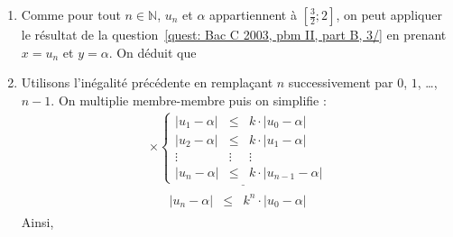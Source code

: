 \begin{description}
\begin{enumerate}
\begin{enumerate}
\begin{itemize}
							\item Comme $h'(x) \leq 0$ alors la fonction $h$ est d\'ecroissante.
								Par cons\'equent 
								$ \frac{3}{2} \leq u_n \leq 2 \Rightarrow h \left( \frac{3}{2} \right) \geq h (u_n) \geq h(2)$,
								c'est-\`a-dire 
								$ \expo{\frac{2}{3}} \geq u_{n+1} \geq \expo{\frac{1}{2}} $.
								De plus, $2 \geq h(2) = \expo{\frac{2}{3}}$ et $h(2) = \expo{\frac{1}{2}} \geq \frac{3}{2}$ ;
								donc 
								\emph{$ \frac{3}{2} \leq u_{n+1} \leq 2$}.
								Ainsi, la propri\'et\'e est vraie \`a l'ordre $n+1$ et ceci ach\`eve notre d\'emonstration.
						\end{itemize}
						On d\'eduit que 
					\item {}
						Comme pour tout $n \in \mathbb{N}$, $u_n$ et $\alpha$ appartiennent \`a $\left[\frac{3}{2} ; 2 \right]$, 
						on peut appliquer le r\'esultat de la question~\ref{quest: Bac C 2003, pbm II, part B, 3/}
						en prenant $x = u_n$ et $y = \alpha$.
						On d\'eduit que 
					\item 
							Utilisons l'in\'egalit\'e pr\'ec\'edente en rempla\c{c}ant $n$ successivement par $0$, $1$, \ldots , $n-1$.
							On multiplie membre-membre puis on simplifie :
							\[
								\begin{matrix}
										\times
									\underline{
										\left\lbrace
											\begin{array}{ccc}
												| u_1 - \alpha |	& \leq 	& k 	\cdot	| u_0 		- \alpha	| 	\\
												| u_2 - \alpha |	& \leq 	& k 	\cdot	| u_1 		- \alpha	| 	\\
														\vdots			& \vdots	&		\vdots								\\
												| u_n - \alpha |	& \leq 	& k 	\cdot	| u_{n-1}- \alpha	| 	
											\end{array}
										\right.
									}
									\\
										\quad \ 
										\begin{array}{rcl}
											| u_n - \alpha |	& \leq 	& k^n \cdot	| u_0 		- \alpha	| 	
										\end{array}
								\end{matrix}
							\]
							Ainsi, 
							

\end{enumerate}
\end{enumerate}
\end{description}
